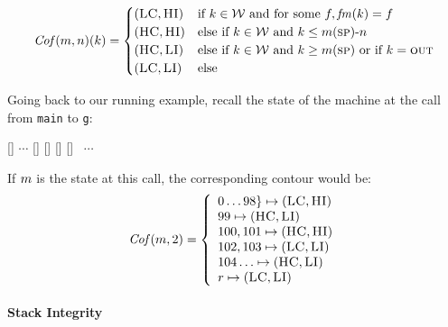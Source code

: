 \documentclass[acmsmall,review,anonymous]{acmart}\settopmatter{printfolios=true,printccs=false,printacmref=false}
\begin{document}
 \[\mathit{Cof}(m,n)(k) =
  \begin{cases}
    (\textsc{LC},\textsc{HI}) & \text{if } k \in {\mathcal W}
                         \text{ and for some } f, \mathit{fm}(k) = f \\
    (\textsc{HC},\textsc{HI}) & \text{else if } k \in {\mathcal W}
                          \text{ and } k \leq m(\textsc{sp}) \textrm{-}  n \\
    (\textsc{HC},\textsc{LI}) & \text{else if } k \in {\mathcal W}
                          \text{ and } k \geq m(\textsc{sp})
                          \text{ or if } k = \textsc{out}\\
    (\textsc{LC},\textsc{LI}) & \text{else} \\
  \end{cases}\]

Going back to our running example, recall the state of the machine
at the call from {\tt main} to {\tt g}:
\vspace*{0.2em}
\begin{center}
\MemoryLabel{43.5em}{2em}{\SP}
[{}]%
\hspace*{3pt}
$\cdots$
[{}]%
[{}]%
[{}]%
[{}]
~$\cdots$
\\
\end{center}

If $m$ is the state at this call, the corresponding contour would
be:
\[
\mathit{Cof}(m,2) = \left \{
\begin{array}{l}
  0\ldots98\} \mapsto (\textsc{LC}, \textsc{HI})\\
  99 \mapsto (\textsc{HC}, \textsc{LI})\\
  100, 101 \mapsto (\textsc{HC}, \textsc{HI})\\
  102, 103 \mapsto (\textsc{LC}, \textsc{LI})\\
  104\ldots \mapsto (\textsc{HC}, \textsc{LI})\\
  r \mapsto (\textsc{LC}, \textsc{LI})\\
\end{array}
\right .
\]


\paragraph*{Stack Integrity}
\end{document}
